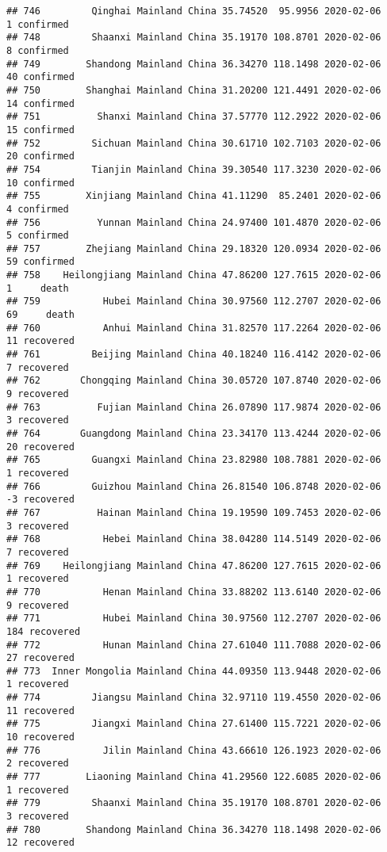 \documentclass[
]{article}
\begin{document}
\begin{verbatim}
## 746         Qinghai Mainland China 35.74520  95.9956 2020-02-06     1 confirmed
## 748         Shaanxi Mainland China 35.19170 108.8701 2020-02-06     8 confirmed
## 749        Shandong Mainland China 36.34270 118.1498 2020-02-06    40 confirmed
## 750        Shanghai Mainland China 31.20200 121.4491 2020-02-06    14 confirmed
## 751          Shanxi Mainland China 37.57770 112.2922 2020-02-06    15 confirmed
## 752         Sichuan Mainland China 30.61710 102.7103 2020-02-06    20 confirmed
## 754         Tianjin Mainland China 39.30540 117.3230 2020-02-06    10 confirmed
## 755        Xinjiang Mainland China 41.11290  85.2401 2020-02-06     4 confirmed
## 756          Yunnan Mainland China 24.97400 101.4870 2020-02-06     5 confirmed
## 757        Zhejiang Mainland China 29.18320 120.0934 2020-02-06    59 confirmed
## 758    Heilongjiang Mainland China 47.86200 127.7615 2020-02-06     1     death
## 759           Hubei Mainland China 30.97560 112.2707 2020-02-06    69     death
## 760           Anhui Mainland China 31.82570 117.2264 2020-02-06    11 recovered
## 761         Beijing Mainland China 40.18240 116.4142 2020-02-06     7 recovered
## 762       Chongqing Mainland China 30.05720 107.8740 2020-02-06     9 recovered
## 763          Fujian Mainland China 26.07890 117.9874 2020-02-06     3 recovered
## 764       Guangdong Mainland China 23.34170 113.4244 2020-02-06    20 recovered
## 765         Guangxi Mainland China 23.82980 108.7881 2020-02-06     1 recovered
## 766         Guizhou Mainland China 26.81540 106.8748 2020-02-06    -3 recovered
## 767          Hainan Mainland China 19.19590 109.7453 2020-02-06     3 recovered
## 768           Hebei Mainland China 38.04280 114.5149 2020-02-06     7 recovered
## 769    Heilongjiang Mainland China 47.86200 127.7615 2020-02-06     1 recovered
## 770           Henan Mainland China 33.88202 113.6140 2020-02-06     9 recovered
## 771           Hubei Mainland China 30.97560 112.2707 2020-02-06   184 recovered
## 772           Hunan Mainland China 27.61040 111.7088 2020-02-06    27 recovered
## 773  Inner Mongolia Mainland China 44.09350 113.9448 2020-02-06     1 recovered
## 774         Jiangsu Mainland China 32.97110 119.4550 2020-02-06    11 recovered
## 775         Jiangxi Mainland China 27.61400 115.7221 2020-02-06    10 recovered
## 776           Jilin Mainland China 43.66610 126.1923 2020-02-06     2 recovered
## 777        Liaoning Mainland China 41.29560 122.6085 2020-02-06     1 recovered
## 779         Shaanxi Mainland China 35.19170 108.8701 2020-02-06     3 recovered
## 780        Shandong Mainland China 36.34270 118.1498 2020-02-06    12 recovered

\end{verbatim}
\end{document}
